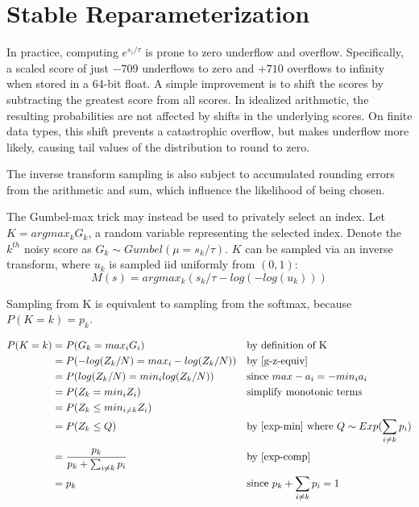 \section{Stable Reparameterization}

In practice, computing $e^{s_i / \tau}$ is prone to zero underflow and overflow. 
Specifically, a scaled score of just $-709$ underflows to zero and $+710$ overflows to infinity when stored in a 64-bit float. 
A simple improvement is to shift the scores by subtracting the greatest score from all scores.
In idealized arithmetic, the resulting probabilities are not affected by shifts in the underlying scores.
On finite data types, this shift prevents a catastrophic overflow, but makes underflow more likely, 
causing tail values of the distribution to round to zero. 

The inverse transform sampling is also subject to accumulated rounding errors from the arithmetic and sum, 
which influence the likelihood of being chosen.

The Gumbel-max trick may instead be used to privately select an index.
Let $K = argmax_k G_k$, a random variable representing the selected index. 
Denote the $k^{th}$ noisy score as $G_k \sim Gumbel(\mu = s_k / \tau)$.
$K$ can be sampled via an inverse transform, where $u_k$ is sampled iid uniformly from $(0, 1)$:
\begin{equation}
    M(s) = argmax_k (s_k / \tau - log(-log(u_k)))
\end{equation}

\begin{theorem}
Sampling from K is equivalent to sampling from the softmax, because $P(K=k) = p_k$. \cite{Medina2020DuffAD}
\end{theorem}
\begin{align*}
    P(K = k) &= P(G_k = max_i G_i) &&\text{by definition of K} \\
    &= P(-log(Z_k / N) = max_i -log(Z_k / N)) &&\text{by \ref{g-z-equiv}}\\
    &= P(log(Z_k / N) = min_i log(Z_k / N)) &&\text{since } max -a_i = -min_i a_i \\
    &= P(Z_k = min_i Z_i) &&\text{simplify monotonic terms} \\
    &= P(Z_k \leq min_{i \neq k} Z_i) \\
    &= P(Z_k \leq Q) &&\text{by \ref{exp-min} where } Q \sim Exp(\sum_{i \neq k} p_i)\\
    &= \frac{p_k}{p_k + \sum_{i \neq k} p_i}  &&\text{by \ref{exp-comp}} \\
    &= p_k &&\text{since } p_k + \sum_{i \neq k} p_i = 1
\end{align*}


